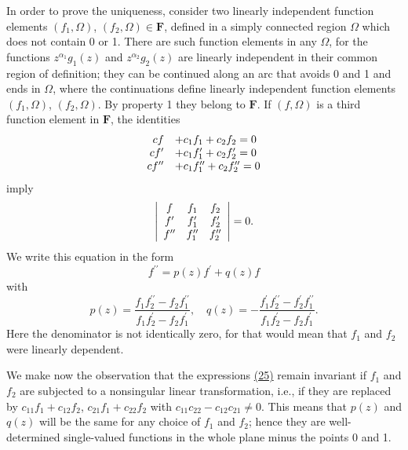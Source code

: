 In order to prove the uniqueness, consider two linearly independent function elements $(f_{1},\Omega)$, $(f_{2},\Omega)\in\mathbf{F}$, defined in a simply connected region $\Omega$ which does not contain 0 or 1. There are such function elements in
any $\Omega$, for the functions $z^{\alpha_1}g_1(z)$ and $z^{\alpha_2}g_2(z)$ are linearly independent in their common region of definition; they can be continued along an arc that avoids 0 and 1 and ends in $\Omega$, where the continuations define linearly independent function elements $(f_1,\Omega)$, $(f_2,\Omega)$. By property 1 they belong to $\mathbf{F}$. If $(f,\Omega)$ is a third function element in $\mathbf{F}$, the identities
\begin{equation*}
\begin{array}{r l} {c f} & {+ c _ {1} f _ {1} + c _ {2} f _ {2} = 0} \\ {c f ^ {\prime}} & {+ c _ {1} f _ {1} ^ {\prime} + c _ {2} f _ {2} ^ {\prime} = 0} \\ {c f ^ {\prime \prime}} & {+ c _ {1} f _ {1} ^ {\prime \prime} + c _ {2} f _ {2} ^ {\prime \prime} = 0} \end{array}
\end{equation*}
imply
\begin{equation*}
\left| \begin{array}{c c c} f & f _ {1} & f _ {2} \\ f ^ {\prime} & f _ {1} ^ {\prime} & f _ {2} ^ {\prime} \\ f ^ {\prime \prime} & f _ {1} ^ {\prime \prime} & f _ {2} ^ {\prime \prime} \end{array} \right| = 0.
\end{equation*}
We write this equation in the form
\begin{equation*}
f ^ {\prime \prime} = p (z) f ^ {\prime} + q (z) f
\end{equation*}
with
\begin{equation*}
p (z) = \frac {f _ {1} f _ {2} ^ {\prime \prime} - f _ {2} f _ {1} ^ {\prime \prime}}{f _ {1} f _ {2} ^ {\prime} - f _ {2} f _ {1} ^ {\prime}}, \quad q (z) = - \frac {f _ {1} ^ {\prime} f _ {2} ^ {\prime \prime} - f _ {2} ^ {\prime} f _ {1} ^ {\prime \prime}}{f _ {1} f _ {2} ^ {\prime} - f _ {2} f _ {1} ^ {\prime}}.\tag{25}\label{eq:8.25}
\end{equation*}
Here the denominator is not identically zero, for that would mean that $f_{1}$ and $f_{2}$ were linearly dependent.

We make now the observation that the expressions \hyperref[eq:8.25]{(25)} remain invariant if $f_{1}$ and $f_{2}$ are subjected to a nonsingular linear transformation, i.e., if they are replaced by $c_{11}f_{1} + c_{12}f_{2}$, $c_{21}f_{1} + c_{22}f_{2}$ with $c_{11}c_{22} - c_{12}c_{21} \neq 0$. This means that $p(z)$ and $q(z)$ will be the same for any choice of $f_{1}$ and $f_{2}$; hence they are well-determined single-valued functions in the whole plane minus the points 0 and 1.

